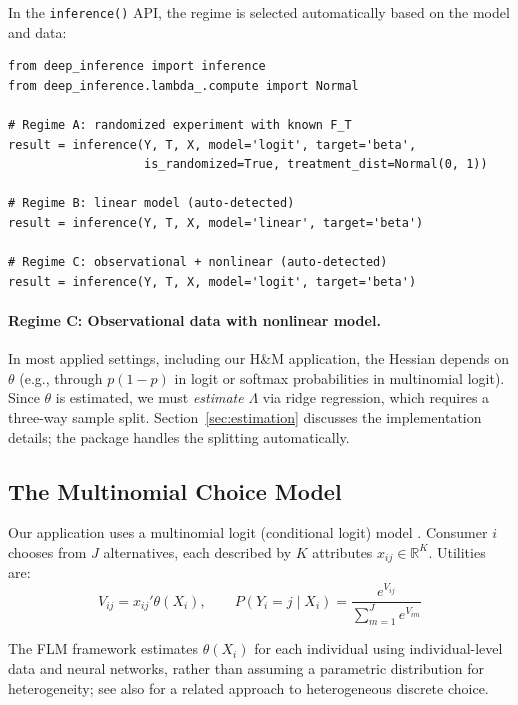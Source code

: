 In the \texttt{inference()} API, the regime is selected automatically based on the model and data:

\begin{lstlisting}
from deep_inference import inference
from deep_inference.lambda_.compute import Normal

# Regime A: randomized experiment with known F_T
result = inference(Y, T, X, model='logit', target='beta',
                   is_randomized=True, treatment_dist=Normal(0, 1))

# Regime B: linear model (auto-detected)
result = inference(Y, T, X, model='linear', target='beta')

# Regime C: observational + nonlinear (auto-detected)
result = inference(Y, T, X, model='logit', target='beta')
\end{lstlisting}

\paragraph{Regime C: Observational data with nonlinear model.}
In most applied settings, including our H\&M application, the Hessian depends on $\theta$ (e.g., through $p(1-p)$ in logit or softmax probabilities in multinomial logit). Since $\theta$ is estimated, we must \emph{estimate} $\Lambda$ via ridge regression, which requires a three-way sample split. Section~\ref{sec:estimation} discusses the implementation details; the package handles the splitting automatically.

\subsection{The Multinomial Choice Model}\label{sec:mnl}

Our application uses a multinomial logit (conditional logit) model \citep{mcfadden1974conditional, berry1995automobile, train2009discrete}. Consumer $i$ chooses from $J$ alternatives, each described by $K$ attributes $x_{ij} \in \mathbb{R}^K$. Utilities are:
\begin{equation}
    V_{ij} = x_{ij}' \theta(X_i), \qquad P(Y_i = j \mid X_i) = \frac{e^{V_{ij}}}{\sum_{m=1}^J e^{V_{im}}}
\end{equation}

The FLM framework estimates $\theta(X_i)$ for each individual using individual-level data and neural networks, rather than assuming a parametric distribution for heterogeneity; see also \citet{hetzenecker2024deep} for a related approach to heterogeneous discrete choice.

